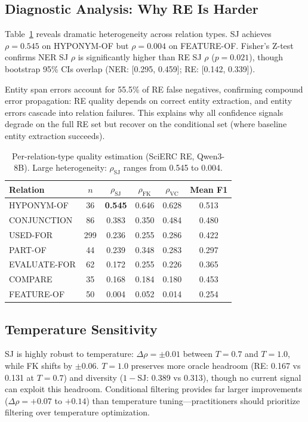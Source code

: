 \documentclass[11pt,a4paper]{article}
\begin{document}
\subsection{Diagnostic Analysis: Why RE Is Harder}
\label{sec:diagnostic}

Table~\ref{tab:perrelation} reveals dramatic heterogeneity across relation types.
SJ achieves $\rho{=}0.545$ on HYPONYM-OF but $\rho{=}0.004$ on FEATURE-OF.
Fisher's Z-test confirms NER SJ $\rho$ is significantly higher than RE SJ $\rho$ ($p{=}0.021$), though bootstrap 95\% CIs overlap (NER: [0.295, 0.459]; RE: [0.142, 0.339]).

Entity span errors account for 55.5\% of RE false negatives, confirming compound error propagation: RE quality depends on correct entity extraction, and entity errors cascade into relation failures.
This explains why all confidence signals degrade on the full RE set but recover on the conditional set (where baseline entity extraction succeeds).

\begin{table}[t]
\centering
\small
\caption{Per-relation-type quality estimation (SciERC RE, Qwen3-8B). Large heterogeneity: $\rho_{\text{SJ}}$ ranges from 0.545 to 0.004.}
\label{tab:perrelation}
\begin{tabular}{l c ccc c}
\toprule
Relation & $n$ & $\rho_{\text{SJ}}$ & $\rho_{\text{FK}}$ & $\rho_{\text{VC}}$ & Mean F1 \\
\midrule
HYPONYM-OF   & 36  & \textbf{0.545} & 0.646 & 0.628 & 0.513 \\
CONJUNCTION  & 86  & 0.383 & 0.350 & 0.484 & 0.480 \\
USED-FOR     & 299 & 0.236 & 0.255 & 0.286 & 0.422 \\
PART-OF      & 44  & 0.239 & 0.348 & 0.283 & 0.297 \\
EVALUATE-FOR & 62  & 0.172 & 0.255 & 0.226 & 0.365 \\
COMPARE      & 35  & 0.168 & 0.184 & 0.180 & 0.453 \\
FEATURE-OF   & 50  & 0.004 & 0.052 & 0.014 & 0.254 \\
\bottomrule
\end{tabular}
\end{table}

\subsection{Temperature Sensitivity}
\label{sec:temperature}

SJ is highly robust to temperature: $\Delta\rho{=}\pm 0.01$ between $T{=}0.7$ and $T{=}1.0$, while FK shifts by $\pm 0.06$.
$T{=}1.0$ preserves more oracle headroom (RE: 0.167 vs 0.131 at $T{=}0.7$) and diversity ($1{-}\text{SJ}$: 0.389 vs 0.313), though no current signal can exploit this headroom.
Conditional filtering provides far larger improvements ($\Delta\rho{=}+0.07$ to $+0.14$) than temperature tuning---practitioners should prioritize filtering over temperature optimization.
\end{document}
